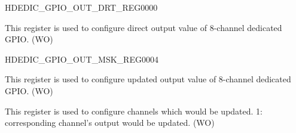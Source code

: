 \begin{register}{H}{DEDIC\_GPIO\_OUT\_DRT\_REG}{\hexprefix{}0000}\label{regdesc:DEDICGPIOOUTDRTREG}
%
%
\regnewline%
\begin{regdesc}\begin{reglist}
\label{fielddesc:DEDICGPIOOUTDRTVLAUE}\item [DEDIC\_GPIO\_OUT\_DRT\_VLAUE] This register is used to configure direct output value of 8-channel dedicated GPIO. (WO)
\end{reglist}\end{regdesc}
\end{register}


\begin{register}{H}{DEDIC\_GPIO\_OUT\_MSK\_REG}{\hexprefix{}0004}\label{regdesc:DEDICGPIOOUTMSKREG}
%
%
%
\regnewline%
\begin{regdesc}\begin{reglist}
\label{fielddesc:DEDICGPIOOUTVALUE}\item [DEDIC\_GPIO\_OUT\_VALUE] This register is used to configure updated output value of 8-channel dedicated GPIO. (WO)
\label{fielddesc:DEDICGPIOOUTMSK}\item [DEDIC\_GPIO\_OUT\_MSK] This register is used to configure channels which would be updated. 1: corresponding channel's output would be updated. (WO)
\end{reglist}\end{regdesc}
\end{register}


